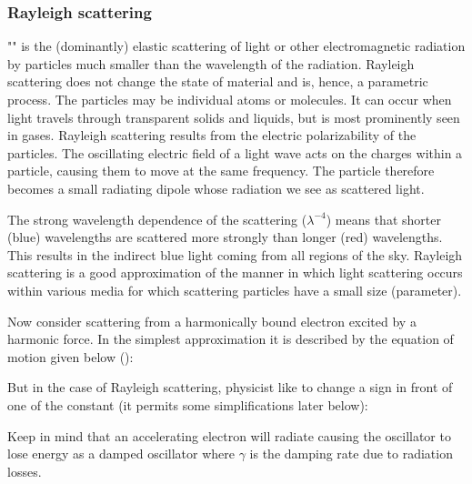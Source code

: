 	\subsubsection{Rayleigh scattering}\label{Rayleigh scattering}
	"" is the (dominantly) elastic scattering of light or other electromagnetic radiation by particles much smaller than the wavelength of the radiation. Rayleigh scattering does not change the state of material and is, hence, a parametric process. The particles may be individual atoms or molecules. It can occur when light travels through transparent solids and liquids, but is most prominently seen in gases. Rayleigh scattering results from the electric polarizability of the particles. The oscillating electric field of a light wave acts on the charges within a particle, causing them to move at the same frequency. The particle therefore becomes a small radiating dipole whose radiation we see as scattered light.

	The strong wavelength dependence of the scattering ($\lambda^{-4}$) means that shorter (blue) wavelengths are scattered more strongly than longer (red) wavelengths. This results in the indirect blue light coming from all regions of the sky. Rayleigh scattering is a good approximation of the manner in which light scattering occurs within various media for which scattering particles have a small size (parameter).
	
	Now consider scattering from a harmonically bound electron excited by a harmonic force. In the simplest approximation it is described by the equation of motion given below ():
	
	But in the case of Rayleigh scattering, physicist like to change a sign in front of one of the constant (it permits some simplifications later below):
	
	Keep in mind that an accelerating electron will radiate causing the oscillator to lose energy as a damped oscillator where $\gamma$ is the damping rate due to radiation losses.
	
